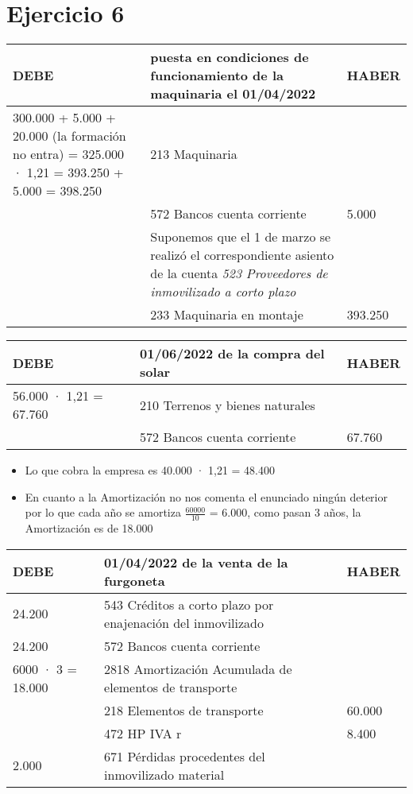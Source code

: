 \documentclass[a4paper,12pt]{article}
\newcommand{\PPIM}{671 Pérdidas procedentes del inmovilizado material}
\newcommand{\bancos}{572 Bancos cuenta corriente}
\newcommand{\enajenacion}{543 Créditos a corto plazo por enajenación del inmovilizado}
\newcommand{\myequation}[2]{\ensuremath{\frac{#1}{#2}}}
\begin{document}
\section{Ejercicio 6}

\begin{table}[H]
    \centering
    \begin{tabular}{|p{3cm}|p{6cm}|p{3cm}|}
    \hline
    \textbf{DEBE} & \textbf{puesta en condiciones de funcionamiento de la maquinaria el 01/04/2022} & \textbf{HABER} \\
    \hline
    300.000 + 5.000 + 20.000 (la formación no entra) = 325.000 · 1,21 = 393.250 + 5.000 = 398.250 & 213 Maquinaria & \\
    \hline
    & \bancos& 5.000\\
    \hline
    &Suponemos que el 1 de marzo se realizó el correspondiente asiento de la cuenta \textit{523 Proveedores de inmovilizado a corto plazo} & \\
    \hline
    & 233 Maquinaria en montaje& 393.250 \\
    \hline
    \end{tabular}
\end{table}

\begin{table}[H]
    \centering
    \begin{tabular}{|p{3cm}|p{6cm}|p{3cm}|}
    \hline
    \textbf{DEBE} & \textbf{01/06/2022 de la compra del solar} & \textbf{HABER} \\
    \hline
    56.000 · 1,21 = 67.760 & 210 Terrenos y bienes naturales & \\
    \hline
    & \bancos & 67.760\\
    \hline
    \end{tabular}
\end{table}
\begin{itemize}
    \item Lo que cobra la empresa es 40.000 · 1,21 = 48.400
    \item En cuanto a la Amortización no nos comenta el enunciado ningún deterior por lo que cada año se amortiza \myequation{60000}{10} = 6.000, como pasan 3 años, la Amortización es de 18.000
\end{itemize}

\begin{table}[H]
    \centering
    \begin{tabular}{|p{3cm}|p{6cm}|p{3cm}|}
    \hline
    \textbf{DEBE} & \textbf{01/04/2022 de la venta de la furgoneta} & \textbf{HABER} \\
    \hline
    24.200 & \enajenacion & \\
    \hline
    24.200 & \bancos & \\
    \hline
    6000 · 3 = 18.000 & 2818 Amortización Acumulada de elementos de transporte& \\
    \hline
    & 218 Elementos de transporte & 60.000\\
    \hline
    & 472 HP IVA r& 8.400\\
    \hline
    2.000& \PPIM & \\
    \hline
    \end{tabular}
\end{table}
\end{document}
